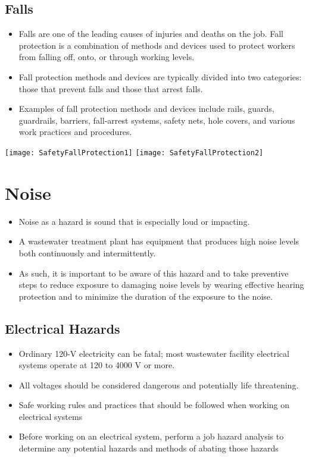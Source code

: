 \subsection{Falls}
\begin{itemize}
\item Falls are one of the leading causes of injuries and deaths on the job.  Fall protection is a combination of methods and devices used to protect workers from falling off, onto, or through working levels. 
\item Fall protection methods and devices are typically divided into two categories: those that prevent falls and those that arrest falls. 
\item Examples of fall protection methods and devices include rails, guards, guardrails, barriers, fall-arrest systems, safety nets, hole covers, and various work practices and procedures.
\end{itemize}
\begin{center}
\texttt{[image: SafetyFallProtection1]}\hspace{1cm} \texttt{[image: SafetyFallProtection2]}\\
\end{center}
\section{Noise}
\begin{itemize}
\item Noise as a hazard is sound that is especially loud or impacting. 
\item A wastewater treatment plant has equipment that produces high noise levels both continuously and intermittently. 
\item As such, it is important to be aware of this hazard and to take preventive steps to reduce exposure to damaging noise levels by wearing effective hearing protection and to minimize the duration of the exposure to the noise.
\end{itemize}

\subsection{Electrical Hazards}
\begin{itemize}
\item Ordinary 120-V electricity can be fatal; most wastewater facility electrical systems operate at 120 to 4000 V or more.  
\item All voltages should be considered dangerous and potentially life threatening.  
\item Safe working rules and practices that should be followed when working on electrical systems
\item Before working on an electrical system, perform a job hazard analysis to determine any potential hazards and methods of abating those hazards
\end{itemize}


